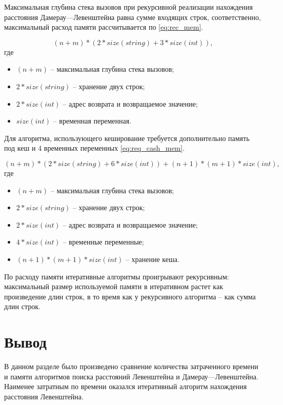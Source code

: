 Максимальная глубина стека вызовов при рекурсивной реализации
нахождения расстояния Дамерау---Левенштейна равна сумме входящих строк,
соответственно, максимальный расход памяти рассчитывается по \eqref{eq:rec_mem}.

\begin{equation}
	\label{eq:rec_mem}
	(n + m) * (2 * size(string) + 3 * size(int)),
\end{equation}
где 
\begin{itemize}
	\item $ (n + m) $ -- максимальная глубина стека вызовов;
	\item $ 2 * size(string) $ -- хранение двух строк;
	\item $ 2 * size(int) $ -- адрес возврата и возвращаемое значение;
	\item $ size(int) $ -- временная переменная.
\end{itemize}

Для алгоритма, использующего кеширование требуется дополнительно память под кеш и 4 временных переменных \eqref{eq:req_cash_mem}.

\begin{equation}
	\label{eq:req_cash_mem}
	(n + m) * (2 * size(string) + 6 * size(int)) + (n + 1) * (m + 1) * size(int),
\end{equation}
где 
\begin{itemize}
	\item $ (n + m) $ -- максимальная глубина стека вызовов;
	\item $ 2 * size(string) $ -- хранение двух строк;
	\item $ 2 * size(int) $ -- адрес возврата и возвращаемое значение;
	\item $ 4 * size(int) $ -- временные переменные;
	\item $ (n + 1) * (m + 1) * size(int) $ -- хранение кеша.
\end{itemize}

По расходу памяти итеративные алгоритмы проигрывают рекурсивным: максимальный размер используемой памяти в итеративном растет
как произведение длин строк, в то время как у рекурсивного алгоритма --
как сумма длин строк.


\section*{Вывод}

В данном разделе было произведено сравнение количества затраченного времени и памяти алгоритмов поиска расстояний Левенштейна и
Дамерау---Левенштейна. Наименее затратным по времени оказался итеративный алгоритм нахождения расстояния Левенштейна.

